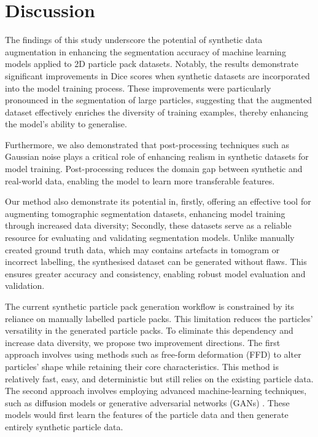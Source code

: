 \documentclass[preprint,12pt]{elsarticle}
\begin{document}
\section{Discussion}
The findings of this study underscore the potential of synthetic data augmentation in enhancing the segmentation accuracy of machine learning models applied to 2D particle pack datasets. 
Notably, the results demonstrate significant improvements in Dice scores when synthetic datasets are incorporated into the model training process. 
These improvements were particularly pronounced in the segmentation of large particles, suggesting that the augmented dataset effectively enriches the diversity of training examples, thereby enhancing the model's ability to generalise.
\par
Furthermore, we also demonstrated that post-processing techniques such as Gaussian noise plays a critical role of enhancing realism in synthetic datasets for model training. 
Post-processing reduces the domain gap between synthetic and real-world data, enabling the model to learn more transferable features.
\par
Our method also demonstrate its potential in, firstly, offering an effective tool for augmenting tomographic segmentation datasets, enhancing model training through increased data diversity;
Secondly, these datasets serve as a reliable resource for evaluating and validating segmentation models. 
Unlike manually created ground truth data, which may contains artefacts in tomogram or incorrect labelling, the synthesised dataset can be generated without flaws. 
This ensures greater accuracy and consistency, enabling robust model evaluation and validation.
\par
The current synthetic particle pack generation workflow is constrained by its reliance on manually labelled particle packs. 
This limitation reduces the particles' versatility in the generated particle packs. 
To eliminate this dependency and increase data diversity, we propose two improvement directions. 
The first approach involves using methods such as free-form deformation (FFD) \cite{sederberg1986free} to alter particles' shape while retaining their core characteristics.
This method is relatively fast, easy, and deterministic but still relies on the existing particle data.
The second approach involves employing advanced machine-learning techniques, such as diffusion models \cite{ho2020denoising} or generative adversarial networks (GANs) \cite{goodfellow2014generativea}. 
These models would first learn the features of the particle data and then generate entirely synthetic particle data. 
\end{document}
